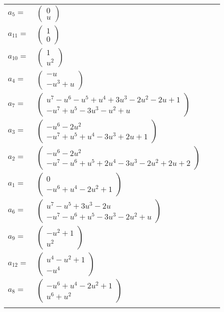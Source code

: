 \documentclass[1p]{elsarticle_modified}
\theoremstyle{definition}
\begin{document}
\begin{tabular}{m{7pt} m{180pt} m{7pt} m{180pt} }
\flushright $a_{5}=$&$\begin{pmatrix}0\\u\end{pmatrix}$ \\
\flushright $a_{11}=$&$\begin{pmatrix}1\\0\end{pmatrix}$ \\
\flushright $a_{10}=$&$\begin{pmatrix}1\\u^2\end{pmatrix}$ \\
\flushright $a_{4}=$&$\begin{pmatrix}- u\\- u^3+u\end{pmatrix}$ \\
\flushright $a_{7}=$&$\begin{pmatrix}u^7- u^6- u^5+u^4+3 u^3-2 u^2-2 u+1\\- u^7+u^5-3 u^3- u^2+u\end{pmatrix}$ \\
\flushright $a_{3}=$&$\begin{pmatrix}- u^6-2 u^2\\- u^7+u^5+u^4-3 u^3+2 u+1\end{pmatrix}$ \\
\flushright $a_{2}=$&$\begin{pmatrix}- u^6-2 u^2\\- u^7- u^6+u^5+2 u^4-3 u^3-2 u^2+2 u+2\end{pmatrix}$ \\
\flushright $a_{1}=$&$\begin{pmatrix}0\\- u^6+u^4-2 u^2+1\end{pmatrix}$ \\
\flushright $a_{6}=$&$\begin{pmatrix}u^7- u^5+3 u^3-2 u\\- u^7- u^6+u^5-3 u^3-2 u^2+u\end{pmatrix}$ \\
\flushright $a_{9}=$&$\begin{pmatrix}- u^2+1\\u^2\end{pmatrix}$ \\
\flushright $a_{12}=$&$\begin{pmatrix}u^4- u^2+1\\- u^4\end{pmatrix}$ \\
\flushright $a_{8}=$&$\begin{pmatrix}- u^6+u^4-2 u^2+1\\u^6+u^2\end{pmatrix}$\\&\end{tabular}
\end{document}
